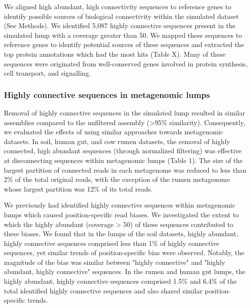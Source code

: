 \documentclass[11pt]{article} %
\begin{document}
We aligned high abundant, high connectivity sequences to reference genes to identify possible sources of biological connectivity within the simulated dataset (See Methods).  We identified 5,087 highly connective sequences present in the simulated lump with a coverage greater than 50.  We mapped these sequences to reference genes to identify potential sources of these sequences and extracted the top protein annotations which had the most hits (Table X).  Many of these sequences were originated from well-conserved genes involved in protein synthesis, cell transport, and signalling.

\subsubsection{Highly connective sequences in metagenomic lumps}

Removal of highly connective sequences in the simulated lump resulted in similar assemblies compared to the unfiltered assembly (>95\% similarity).  Consequently, we evaluated the effects of using similar approaches towards metagenomic datasets.  In soil, human gut, and cow rumen datasets, the removal of highly connected, high abundant sequences (through normalized filtering) was effective at disconnecting sequences within metagenomic lumps (Table 1).  The size of the largest partition of connected reads in each metagenome was reduced to less than 2\% of the total original reads, with the exception of the rumen metagenome whose largest partition was 12\% of its total reads.  

We previously had identified highly connective sequences within metagenomic lumps which caused position-specific read biases.  We investigated the extent to which the highly abundant (coverage > 50) of these sequences contributed to these biases.  We found that in the lumps of the soil datasets, highly abundant, highly connective sequences comprised less than 1\% of highly connective sequences, yet similar trends of position-specific bias were observed.  Notably, the magnitude of the bias was similar between "highly connective" and "highly abundant, highly connective" sequences.  In the rumen and human gut lumps, the highly abundant, highly connective sequences comprised 1.5\% and 6.4\% of the total identified highly connective sequences and also shared similar position-specific trends.  
\end{document}
